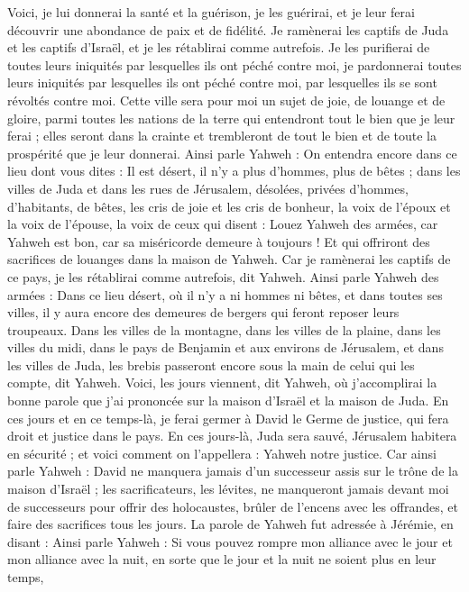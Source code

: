 \begin{multicols}{2}
Voici, je lui donnerai la santé et la guérison, je les guérirai, et je leur ferai découvrir une abondance de paix et de fidélité.
Je ramènerai les captifs de Juda et les captifs d'Israël, et je les rétablirai comme autrefois.
Je les purifierai de toutes leurs iniquités par lesquelles ils ont péché contre moi, je pardonnerai toutes leurs iniquités par lesquelles ils ont péché contre moi, par lesquelles ils se sont révoltés contre moi.
Cette ville sera pour moi un sujet de joie, de louange et de gloire, parmi toutes les nations de la terre qui entendront tout le bien que je leur ferai ; elles seront dans la crainte et trembleront de tout le bien et de toute la prospérité que je leur donnerai.
Ainsi parle Yahweh : On entendra encore dans ce lieu dont vous dites : Il est désert, il n'y a plus d’hommes, plus de bêtes ; dans les villes de Juda et dans les rues de Jérusalem, désolées, privées d’hommes, d’habitants, de bêtes,
les cris de joie et les cris de bonheur, la voix de l'époux et la voix de l’épouse, la voix de ceux qui disent : Louez Yahweh des armées, car Yahweh est bon, car sa miséricorde demeure à toujours ! Et qui offriront des sacrifices de louanges dans la maison de Yahweh. Car je ramènerai les captifs de ce pays,  je les rétablirai comme autrefois, dit Yahweh.
Ainsi parle Yahweh des armées : Dans ce lieu désert, où il n'y a ni hommes ni bêtes, et dans toutes ses villes, il y aura encore des demeures de bergers qui feront reposer leurs troupeaux.
Dans les villes de la montagne, dans les villes de la plaine, dans les villes du midi, dans le pays de Benjamin et aux environs de Jérusalem, et dans les villes de Juda, les brebis passeront encore sous la main de celui qui les compte, dit Yahweh.
Voici, les jours viennent, dit Yahweh, où j’accomplirai la bonne parole que j'ai prononcée sur la maison d'Israël et la maison de Juda.
En ces jours et en ce temps-là, je ferai germer à David le Germe de justice, qui fera droit et justice dans le pays.
En ces jours-là, Juda sera sauvé, Jérusalem habitera en sécurité ; et voici comment on l’appellera : Yahweh notre justice.
Car ainsi parle Yahweh : David ne manquera jamais d’un successeur assis sur le trône de la maison d'Israël ;
les sacrificateurs, les lévites, ne manqueront jamais devant moi de successeurs pour offrir des holocaustes, brûler de l’encens avec les offrandes, et faire des sacrifices tous les jours.
La parole de Yahweh fut adressée à Jérémie, en disant :
Ainsi parle Yahweh : Si vous pouvez rompre mon alliance avec le jour et mon alliance avec la nuit, en sorte que le jour et la nuit ne soient plus en leur temps,

\end{multicols}
